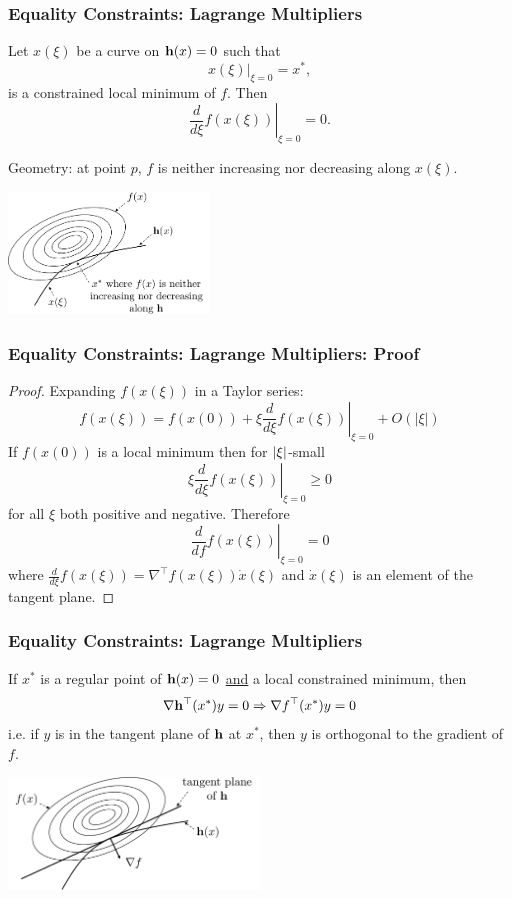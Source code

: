 \documentclass{beamer}
\begin{document}
\begin{frame}\frametitle{Equality Constraints: Lagrange Multipliers}
	\begin{lemma}
		Let $x(\xi)$ be a curve on $\mathbf{h}(x) = 0$ such that 
		\[
			\left. x(\xi)\right|_{\xi=0} = x^{\ast},
		\] 
		is a constrained local minimum of $f$.		
		Then 
		\[
			\left. \displaystyle\frac{d}{d\xi}f(x(\xi))\right|_{\xi=0} = 0.
		\]		
	\end{lemma}
	Geometry: at point $p$, $f$ is neither increasing nor decreasing along $x(\xi)$.
	\begin{center}
		\includegraphics[width=0.4\textwidth]
			{figures/chap18_constraint_along_h}
	\end{center}
		
\end{frame}

\begin{frame}\frametitle{Equality Constraints: Lagrange Multipliers: Proof}
	\begin{proof}
		Expanding $f(x(\xi))$ in a Taylor series:
		\[ 
			f(x(\xi)) = \left. f(x(0)) + \xi\frac{d}{d\xi}f(x(\xi))\right|_{\xi=0} + O(|\xi|) 
		\]
		If $f(x(0))$ is a local minimum then for $\left|\xi\right|$-small
		\[ 
			\left. \xi\frac{d}{d\xi}f(x(\xi))\right|_{\xi =0} \geq 0 
		\]
		for all $\xi$ both positive and negative.  Therefore
		\[ 
			\left. \frac{d}{df}f(x(\xi))\right|_{\xi=0} = 0 
		\]
		where
		\( 
			\frac{d}{d\xi}f(x(\xi)) = \nabla^\top f(x(\xi)) \dot{x}(\xi)
		\)
		and $\dot{x}(\xi)$ is an element of the tangent plane.
	\end{proof}
\end{frame}

\begin{frame}\frametitle{Equality Constraints: Lagrange Multipliers}
	\begin{lemma}
		If $x^{\ast}$ is a regular point of $\mathbf{h}(x) = 0$ \underline{and} a local constrained minimum, then 
		\[ 
			\nabla \mathbf{h}^\top (x^{\ast})y = 0 \Rightarrow \nabla f^\top (x^{\ast})y = 0 
		\]
		i.e. if $y$ is in the tangent plane of $\mathbf{h}$ at $x^{\ast}$, then $y$ is orthogonal to the gradient of $f$.	
	\end{lemma}
	\begin{center}
		\includegraphics[width=0.5\textwidth]
			{figures/chap18_tangent_plane_of_h}
	\end{center}	
\end{frame}
\end{document}

